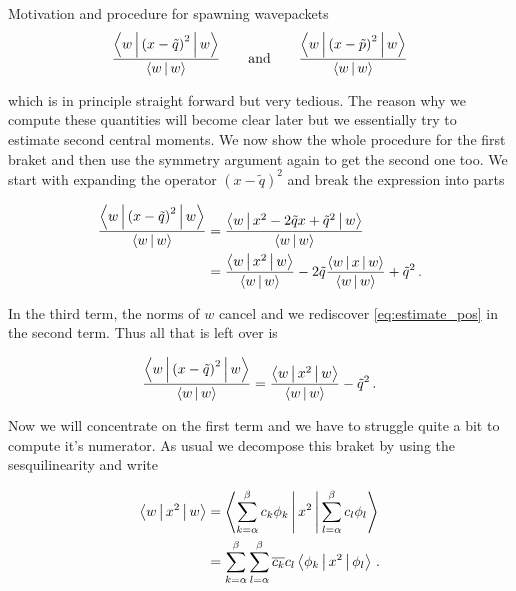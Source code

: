 \begin{chapter}{Motivation and procedure for spawning wavepackets}
\begin{equation} \label{eq:est_second_moments_def}
  \frac{\Braket{w | \left(x-\tilde{q}\right)^2 | w}}{\Braket{w|w}}
  \qquad \text{and} \qquad
  \frac{\Braket{w | \left(x-\tilde{p}\right)^2 | w}}{\Braket{w|w}}  
\end{equation}

which is in principle straight forward but very tedious. The reason why we compute
these quantities will become clear later but we essentially try to estimate second
central moments. We now show the whole procedure for the first braket and then use
the symmetry argument again to get the second one too. We start with expanding the
operator $\left(x-\tilde{q}\right)^2$ and break the expression into parts

\begin{equation} \label{eq:est_second_moment_pos}
\begin{split}
  \frac{\Braket{w | \left(x-\tilde{q}\right)^2 | w}}{\Braket{w|w}}
  & = \frac{\Braket{w | x^2 - 2 \tilde{q} x + \tilde{q}^2 | w}}{\Braket{w|w}} \\
  & = \frac{\Braket{w | x^2 | w}}{\Braket{w|w}}
    - 2 \tilde{q} \frac{\Braket{w | x | w}}{\Braket{w|w}}
    + \tilde{q}^2 \,.
\end{split}
\end{equation}

In the third term, the norms of $w$ cancel and we rediscover \eqref{eq:estimate_pos}
in  the second term. Thus all that is left over is

\begin{equation} \label{eq:est_second_moment_simplified}
  \frac{\Braket{w | \left(x-\tilde{q}\right)^2 | w}}{\Braket{w|w}}
  = \frac{\Braket{w | x^2 | w}}{\Braket{w|w}} - \tilde{q}^2 \,.
\end{equation}

Now we will concentrate on the first term and we have to struggle quite a bit to
compute it's numerator. As usual we decompose this braket by using the sesquilinearity
and write

\begin{equation} \label{eq:braket_basis_x2}
\begin{split}
  \Braket{w | x^2 | w}
  & = \Braket{\sum_{k=\alpha}^\beta c_k \phi_k | x^2 | \sum_{l=\alpha}^\beta c_l \phi_l} \\
  & = \sum_{k=\alpha}^\beta \sum_{l=\alpha}^\beta \overline{c_k} c_l \Braket{\phi_k | x^2 | \phi_l} \,.
\end{split}
\end{equation}


\end{chapter}
